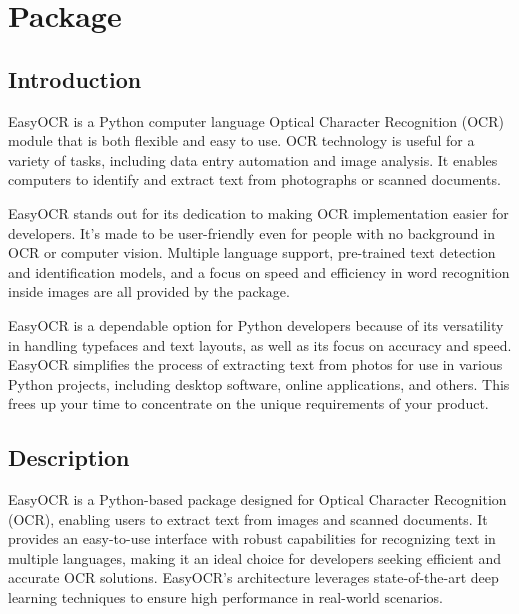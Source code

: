%
%
%


\chapter{Package }

\section{Introduction}

EasyOCR is a Python computer language Optical Character Recognition (OCR) module that is both flexible and easy to use. OCR technology is useful for a variety of tasks, including data entry automation and image analysis. It enables computers to identify and extract text from photographs or scanned documents.

EasyOCR stands out for its dedication to making OCR implementation easier for developers. It’s made to be user-friendly even for people with no background in OCR or computer vision. Multiple language support, pre-trained text detection and identification models, and a focus on speed and efficiency in word recognition inside images are all provided by the package.

EasyOCR is a dependable option for Python developers because of its versatility in handling typefaces and text layouts, as well as its focus on accuracy and speed. EasyOCR simplifies the process of extracting text from photos for use in various Python projects, including desktop software, online applications, and others. This frees up your time to concentrate on the unique requirements of your product. \cite{Mahajan:2023}

\section{Description}

EasyOCR is a Python-based package designed for Optical Character Recognition (OCR), enabling users to extract text from images and scanned documents. It provides an easy-to-use interface with robust capabilities for recognizing text in multiple languages, making it an ideal choice for developers seeking efficient and accurate OCR solutions. EasyOCR's architecture leverages state-of-the-art deep learning techniques to ensure high performance in real-world scenarios.

